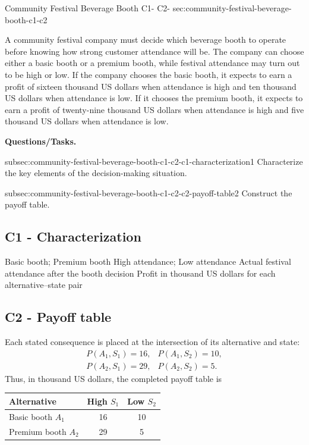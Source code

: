 	\sectionScored
	{Community Festival Beverage Booth}
	{C1- \hspace{2mm} C2-}
	{sec:community-festival-beverage-booth-c1-c2}
	{
		A community festival company must decide which beverage booth to operate before knowing how strong customer attendance will be. The company can choose either a basic booth or a premium booth, while festival attendance may turn out to be high or low. If the company chooses the basic booth, it expects to earn a profit of sixteen thousand US dollars when attendance is high and ten thousand US dollars when attendance is low. If it chooses the premium booth, it expects to earn a profit of twenty-nine thousand US dollars when attendance is high and five thousand US dollars when attendance is low.
		
		\textbf{Questions/Tasks.}
		\begin{enumerate}
			\CriterionTask
			{subsec:community-festival-beverage-booth-c1-c2-c1-characterization}{1}
			{Characterize the key elements of the decision-making situation. }
			
			\CriterionTask
			{subsec:community-festival-beverage-booth-c1-c2-c2-payoff-table}{2}
			{Construct the payoff table. }
		\end{enumerate}
		
		\label{subsec:community-festival-beverage-booth-c1-c2-c1-characterization}
		\subsection*{C1 - Characterization }
		
		\DecisionElementsTable
		{Basic booth; Premium booth}
		{High attendance; Low attendance}
		{Actual festival attendance after the booth decision}
		{Profit in thousand US dollars for each alternative--state pair}
		
		\label{subsec:community-festival-beverage-booth-c1-c2-c2-payoff-table}
		\subsection*{C2 - Payoff table }
		
		Each stated consequence is placed at the intersection of its alternative and state:
		\[
		\begin{array}{ll}
			P(A_1,S_1)=16, & P(A_1,S_2)=10,\\
			P(A_2,S_1)=29, & P(A_2,S_2)=5.
		\end{array}
		\]
		Thus, in thousand US dollars, the completed payoff table is
		\begin{center}
			\begin{tabular}{lcc}
				\toprule
				Alternative & High \(S_1\) & Low \(S_2\)\\
				\midrule
				Basic booth \(A_1\) & 16 & 10\\
				Premium booth \(A_2\) & 29 & 5\\
				\bottomrule
			\end{tabular}
		\end{center}
		
}
